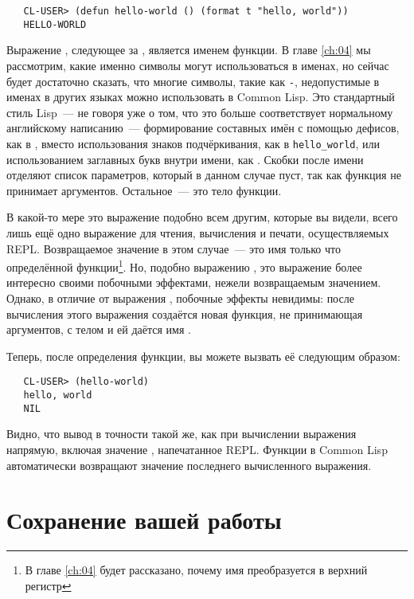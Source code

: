 \begin{verbatim}
   CL-USER> (defun hello-world () (format t "hello, world"))
   HELLO-WORLD
\end{verbatim}

Выражение , следующее за , является именем функции. В главе \ref{ch:04} мы
рассмотрим, какие именно символы могут использоваться в именах, но сейчас будет достаточно
сказать, что многие символы, такие как \lstinline|-|, недопустимые в именах в других
языках можно использовать в Common Lisp. Это стандартный стиль Lisp~--- не говоря уже о том,
что это больше соответствует нормальному английскому написанию~--- формирование составных имён с помощью дефисов,
как в , вместо использования знаков подчёркивания, как в \lstinline|hello_world|, или
использованием заглавных букв внутри имени, как . Скобки \code{()} после имени отделяют
список параметров, который в данном случае пуст, так как функция не принимает
аргументов. Остальное~--- это тело функции.

В какой-то мере это выражение подобно всем другим, которые вы видели, всего лишь ещё одно
выражение для чтения, вычисления и печати, осуществляемых REPL. Возвращаемое значение в
этом случае~--- это имя только что определённой функции\footnote{В главе \ref{ch:04} будет рассказано,
  почему имя преобразуется в верхний регистр}. Но, подобно выражению , это выражение
более интересно своими побочными эффектами, нежели возвращаемым значением. Однако, в
отличие от выражения , побочные эффекты невидимы: после вычисления этого выражения
создаётся новая функция, не принимающая аргументов, с телом  и ей даётся имя .

Теперь, после определения функции, вы можете вызвать её следующим образом:

\begin{verbatim}
   CL-USER> (hello-world)
   hello, world
   NIL
\end{verbatim}

Видно, что вывод в точности такой же, как при вычислении выражения 
напрямую, включая значение , напечатанное REPL. Функции в Common Lisp автоматически
возвращают значение последнего вычисленного выражения.

\section{Сохранение вашей работы}

